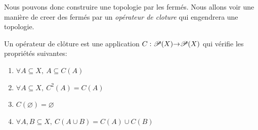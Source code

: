 Nous pouvons donc construire une topologie par les fermés. Nous allons voir une manière de creer des fermés par un \emph{opérateur de cloture} qui engendrera une topologie.

\begin{definition}
    Un opérateur de clôture est une application $C:\mathscr{P}(X){\to}\mathscr{P}(X)$ qui vérifie les propriétés suivantes:
    \begin{enumerate}
        \item $\forall A\subseteq X,\ A\subseteq C(A)$
        \item $\forall A\subseteq X,\ C^2(A)=C(A)$
        \item $C(\varnothing)=\varnothing$
        \item $\forall A,B\subseteq X,\ C(A\cup B) = C(A)\cup C(B)$
    \end{enumerate}
\end{definition}

